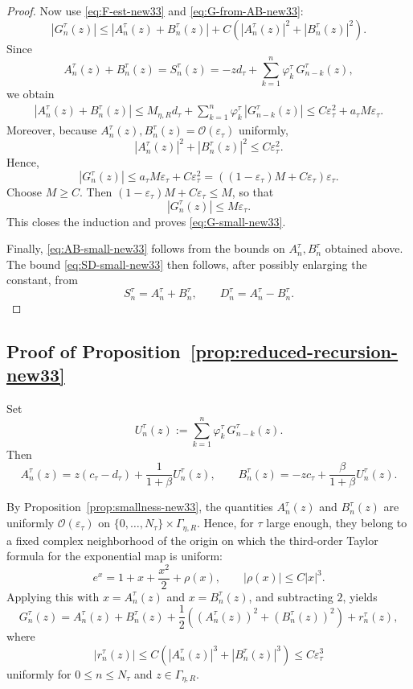 \documentclass[letterpaper]{article}
\numberwithin{equation}{section}
\theoremstyle{definition}
\theoremstyle{remark}
\begin{document}
\begin{proof}
Now use \eqref{eq:F-est-new33} and \eqref{eq:G-from-AB-new33}:
\[
  |G_n^\tau(z)|
  \le |A_n^\tau(z)+B_n^\tau(z)|
      +C\left(|A_n^\tau(z)|^2+|B_n^\tau(z)|^2\right).
\]
Since
\[
  A_n^\tau(z)+B_n^\tau(z)=S_n^\tau(z)
  =-zd_\tau+\sum_{k=1}^n\varphi_k^\tau\,G_{n-k}^\tau(z),
\]
we obtain
\begin{align*}
  |A_n^\tau(z)+B_n^\tau(z)|
  \le M_{\eta,R}d_\tau
      +\sum_{k=1}^n\varphi_k^\tau\,|G_{n-k}^\tau(z)|
      \le C\varepsilon_\tau^2+a_\tau M\varepsilon_\tau.
\end{align*}
Moreover, because $A_n^\tau(z),B_n^\tau(z)=\mathcal O(\varepsilon_\tau)$ uniformly,
\[
  |A_n^\tau(z)|^2+|B_n^\tau(z)|^2\le C\varepsilon_\tau^2.
\]
Hence,
\[
  |G_n^\tau(z)|\le a_\tau M\varepsilon_\tau + C\varepsilon_\tau^2
  = \left((1-\varepsilon_\tau)M + C\varepsilon_\tau\right)\varepsilon_\tau.
\]
Choose $M\ge C$. Then
$(1-\varepsilon_\tau)M + C\varepsilon_\tau \le M$,
so that
\[
  |G_n^\tau(z)|\le M\varepsilon_\tau.
\]
This closes the induction and proves \eqref{eq:G-small-new33}.

Finally, \eqref{eq:AB-small-new33} follows from the bounds on $A_n^\tau,B_n^\tau$ obtained
above. The bound \eqref{eq:SD-small-new33} then follows, after possibly enlarging the
constant, from
\[
  S_n^\tau=A_n^\tau+B_n^\tau,\qquad D_n^\tau=A_n^\tau-B_n^\tau.
\]
\end{proof}


\subsection{Proof of Proposition~\ref{prop:reduced-recursion-new33}}\label{app:proof-reduced-recursion-new33}
Set
\[
  U_n^\tau(z):=\sum_{k=1}^n \varphi_k^\tau\,G_{n-k}^\tau(z).
\]
Then
\[
  A_n^\tau(z)=z(c_\tau-d_\tau)+\frac{1}{1+\beta}U_n^\tau(z),
\qquad
  B_n^\tau(z)=-zc_\tau+\frac{\beta}{1+\beta}U_n^\tau(z).
\]

By Proposition~\ref{prop:smallness-new33}, the quantities $A_n^\tau(z)$ and $B_n^\tau(z)$
are uniformly $\mathcal O(\varepsilon_\tau)$ on $\{0,\dots,N_\tau\}\times\Gamma_{\eta,R}$.
Hence, for $\tau$ large enough, they belong to a fixed complex neighborhood of the origin on
which the third-order Taylor formula for the exponential map is uniform:
\[
  e^x = 1+x+\frac{x^2}{2}+\rho(x),
  \qquad |\rho(x)|\le C|x|^3.
\]
Applying this with $x=A_n^\tau(z)$ and $x=B_n^\tau(z)$, and subtracting $2$, yields
\[
  G_n^\tau(z)
  =A_n^\tau(z)+B_n^\tau(z)
   +\frac12\left((A_n^\tau(z))^2+(B_n^\tau(z))^2\right)
   +r_n^\tau(z),
\]
where
\[
  |r_n^\tau(z)|\le C\left(|A_n^\tau(z)|^3+|B_n^\tau(z)|^3\right)\le C\varepsilon_\tau^3
\]
uniformly for $0\le n\le N_\tau$ and $z\in\Gamma_{\eta,R}$.
\end{document}
